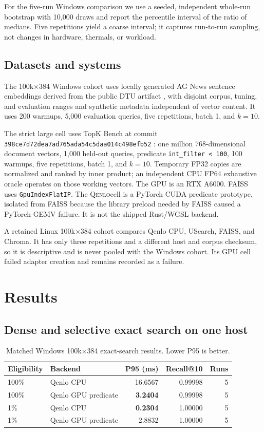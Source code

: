 \documentclass{article}
\newcommand{\qenlo}{\textsc{Qenlo}}
\newcommand{\code}[1]{\texttt{#1}}
\begin{document}
For the five-run Windows comparison we use a seeded, independent whole-run bootstrap with 10,000
draws and report the percentile interval of the ratio of medians. Five repetitions yield a coarse
interval; it captures run-to-run sampling, not changes in hardware, thermals, or workload.

\subsection{Datasets and systems}

The 100k$\times$384 Windows cohort uses locally generated AG News sentence embeddings derived from
the public DTU artifact \citep{nielsen2022agnews}, with disjoint corpus, tuning, and evaluation
ranges and synthetic metadata independent of vector content. It uses 200 warmups, 5,000 evaluation
queries, five repetitions, batch 1, and $k=10$.

The strict large cell uses TopK Bench at commit
\code{398ce7d72dea7ad765ada54c5daa014c498efb52} \citep{topkbench}: one million 768-dimensional
document vectors, 1,000 held-out queries, predicate \code{int\_filter < 100}, 100 warmups, five
repetitions, batch 1, and $k=10$. Temporary FP32 copies are normalized and ranked by inner
product; an independent CPU FP64 exhaustive oracle operates on those working vectors. The GPU is
an RTX A6000. FAISS uses \code{GpuIndexFlatIP}. The \qenlo cell is a PyTorch CUDA predicate
prototype, isolated from FAISS because the library preload needed by FAISS caused a PyTorch GEMV
failure. It is not the shipped Rust/WGSL backend.

A retained Linux 100k$\times$384 cohort compares Qenlo CPU, USearch, FAISS, and Chroma. It has only
three repetitions and a different host and corpus checksum, so it is descriptive and is never
pooled with the Windows cohort. Its GPU cell failed adapter creation and remains recorded as a
failure.

\section{Results}\label{sec:results}

\subsection{Dense and selective exact search on one host}

\begin{table}[t]
\caption{Matched Windows 100k$\times$384 exact-search results. Lower P95 is better.}
\label{tab:windows}
\centering
\small
\begin{tabular}{llrrr}
\toprule
Eligibility & Backend & P95 (ms) & Recall@10 & Runs \\
\midrule
100\% & Qenlo CPU & 16.6567 & 0.99998 & 5 \\
100\% & Qenlo GPU predicate & \textbf{3.2404} & 0.99998 & 5 \\
1\% & Qenlo CPU & \textbf{0.2304} & 1.00000 & 5 \\
1\% & Qenlo GPU predicate & 2.8832 & 1.00000 & 5 \\
\bottomrule
\end{tabular}
\end{table}
\end{document}
